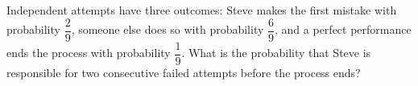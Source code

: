 Independent attempts have three outcomes: Steve makes the first mistake with probability $\dfrac{2}{9}$, someone else does so with probability $\dfrac{6}{9}$, and a perfect performance ends the process with probability $\dfrac{1}{9}$. What is the probability that Steve is responsible for two consecutive failed attempts before the process ends?
